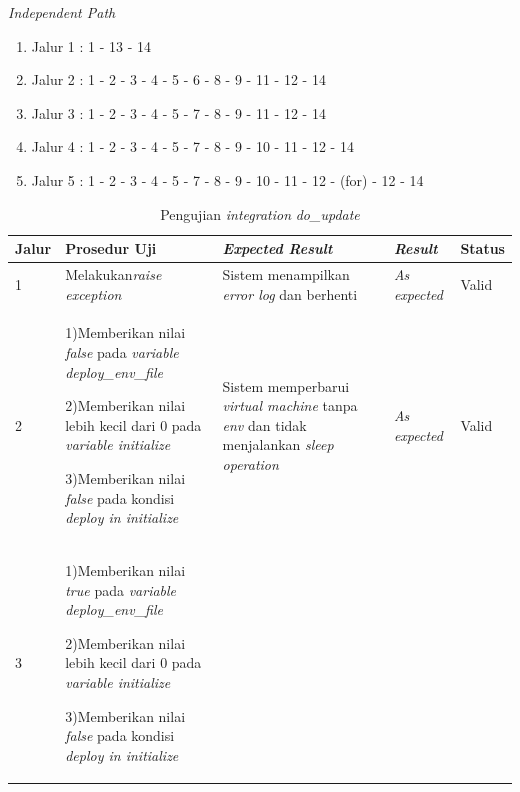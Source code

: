 \noindent
\emph{Independent Path}

\begin{enumerate}
\item Jalur 1 : 1 - 13 - 14
\item Jalur 2 : 1 - 2 - 3 - 4 - 5 - 6 - 8 - 9 - 11 - 12 - 14
\item Jalur 3 : 1 - 2 - 3 - 4 - 5 - 7 - 8 - 9 - 11 - 12 - 14
\item Jalur 4 : 1 - 2 - 3 - 4 - 5 - 7 - 8 - 9 - 10 - 11 - 12 - 14
\item Jalur 5 : 1 - 2 - 3 - 4 - 5 - 7 - 8 - 9 - 10 - 11 - 12 - (for) - 12 - 14
\end{enumerate}


\begin{longtable}{|P{.06\textwidth}|P{.30\textwidth}|P{.30\textwidth}|P{.10\textwidth}|P{.08\textwidth}|}
  \caption{Pengujian \emph{integration} \emph{do\_update}} \label{jalur:update}\\
  \hline
  \textbf{Jalur} & \textbf{Prosedur Uji} & \textbf{\emph{Expected Result}}
  & \textbf{\emph{Result}} & \textbf{Status} \\\hline
  1 & Melakukan\emph{raise exception} & Sistem menampilkan \emph{error log} dan
                               berhenti & \emph{As expected} & Valid \\\hline
  2 & 1)Memberikan nilai \emph{false} pada \emph{variable deploy\_env\_file} \par\null\par
      2)Memberikan nilai lebih kecil dari 0 pada \emph{variable initialize} \par\null\par
      3)Memberikan nilai \emph{false} pada kondisi \emph{deploy in initialize}
                                             & Sistem memperbarui
                                               \emph{virtual machine} tanpa \emph{env} dan tidak menjalankan
                                     \emph{sleep operation} & \emph{As expected} & Valid \\\hline
  3 & 1)Memberikan nilai \emph{true} pada \emph{variable deploy\_env\_file} \par\null\par
      2)Memberikan nilai lebih kecil dari 0 pada \emph{variable initialize} \par\null\par
      3)Memberikan nilai \emph{false} pada kondisi \emph{deploy in initialize}

\end{longtable}
